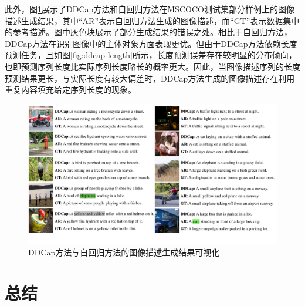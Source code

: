 此外，图\ref{fig:ddcap-qualification}展示了DDCap方法和自回归方法在MSCOCO测试集部分样例上的图像描述生成结果，其中“AR”表示自回归方法生成的图像描述，而“GT”表示数据集中的参考描述。图中灰色块展示了部分生成结果的错误之处。相比于自回归方法，DDCap方法在识别图像中的主体对象方面表现更优。但由于DDCap方法依赖长度预测任务，且如图\ref{fig:ddcap-length}所示，长度预测误差存在较明显的分布倾向，也即预测序列长度比实际序列长度略长的概率更大。因此，当图像描述序列的长度预测结果更长，与实际长度有较大偏差时，DDCap方法生成的图像描述存在利用重复内容填充给定序列长度的现象。
\begin{figure}
  \centering
  \includegraphics[width=1.0\linewidth]{figures/ddcap-qualification.pdf}
  \caption{DDCap方法与自回归方法的图像描述生成结果可视化}
  \label{fig:ddcap-qualification}
\end{figure}

\section{总结}
\label{sec:ddcap-summary}


